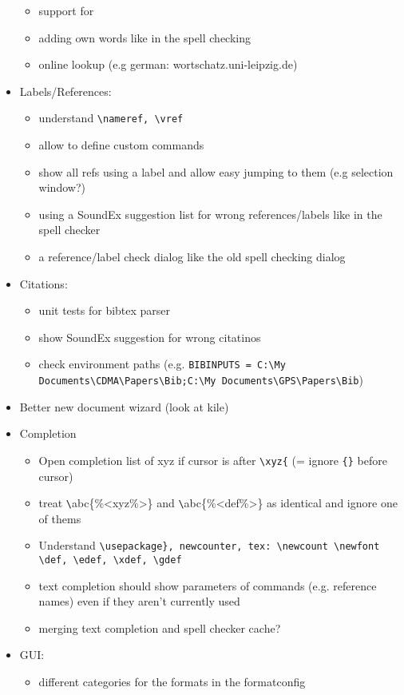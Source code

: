 \documentclass[10pt,a4paper,landscape]{report}
\begin{document}
\begin{itemize}
\begin{itemize}
		\item support for 
		\item adding own words like in the spell checking 
		\item online lookup (e.g german: wortschatz.uni-leipzig.de)
	\end{itemize}
	\item Labels/References: \begin{itemize}
		\item understand \verb+\nameref, \vref+
		\item allow to define custom commands
		\item 	show all refs using a label and allow easy jumping to them (e.g selection window?)
		\item using a SoundEx suggestion list for wrong references/labels like in the spell checker
		\item a reference/label check dialog like the old spell checking dialog
	\end{itemize}
	\item Citations: \begin{itemize}
		\item unit tests for bibtex parser
		\item show SoundEx suggestion for wrong citatinos
		\item check environment paths (e.g. \verb+BIBINPUTS = C:\My Documents\CDMA\Papers\Bib;C:\My Documents\GPS\Papers\Bib+)
	\end{itemize}
	\item Better new document wizard (look at kile)
	\item Completion \begin{itemize}
	 	\item Open completion list of xyz if cursor is after \verb+\xyz{+ (= ignore \verb+{}+ before cursor)
		\item treat \verb+\+abc\{\%<xyz\%>\} and \verb+\+abc\{\%<def\%>\} as identical and ignore one of thems
		\item Understand \verb+\usepackage}, newcounter, tex: \newcount \newfont \def, \edef, \xdef, \gdef+
		\item text completion should show parameters of commands (e.g. reference names) even if they aren't currently used
		\item merging text completion and spell checker cache?
	\end{itemize}
	\item GUI: \begin{itemize}
		\item different categories for the formats in the formatconfig

\end{itemize}
\end{itemize}
\end{document}
